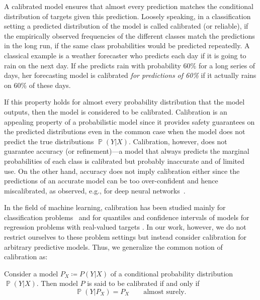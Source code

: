 \documentclass{article}
\DeclareMathOperator{\Prob}{\mathbb{P}}
\begin{document}
A calibrated model ensures that almost every prediction matches the
conditional distribution of targets given this prediction.
Loosely speaking, in a classification setting a predicted
distribution of the model is called calibrated (or reliable), if
the empirically observed frequencies of the different classes
match the predictions in the long run, if the same
class probabilities would be predicted repeatedly.
A classical example is a weather forecaster who predicts each day if it is going to
rain on the next day. If she predicts rain with probability 60\% for
a long series of days, her forecasting model is calibrated \emph{for predictions
of 60\%} if it actually rains on 60\% of these days.

If this property holds for almost every probability distribution that
the model outputs, then the model is considered to be calibrated.
Calibration is an appealing property of a probabilistic model since it provides
safety guarantees on the predicted distributions even in the common case
when the model does not predict the true distributions $\Prob(Y | X)$.
Calibration, however, does not guarantee accuracy (or refinement)---a model
that always predicts the marginal probabilities of each class
is calibrated but probably inaccurate and of limited use. On the other
hand, accuracy does not imply calibration either since the predictions
of an accurate model can be too over-confident and hence miscalibrated,
as observed, e.g., for deep neural networks~\citep{Guo2017}.

In the field of machine learning, calibration has been
studied mainly for classification problems~\citep{Guo2017,Widmann2019,Vaicenavicius2019,Platt2000,Zadrozny2002,Broecker2009,Kull2017,Kumar2018,Kull2019}
and for quantiles and confidence intervals of models for regression problems
with real-valued targets \citep{Ho2005,Fasiolo2020,Rueda2006,Taillardat2016,Kuleshov2018}.
In our work, however, we do not restrict ourselves to these problem
settings but instead consider calibration for arbitrary predictive
models.
Thus, we generalize the common notion of calibration as:

\begin{definition}\label{def:calibration}
    Consider a model $P_X \coloneqq P(Y|X)$ of a conditional probability distribution
    $\Prob(Y|X)$. Then model $P$ is said to be calibrated
    if and only if
    \begin{equation}\label{eq:calibration_definition}
        \Prob(Y|P_X) = P_X \qquad \text{almost surely}.
    \end{equation}
\end{definition}
\end{document}
